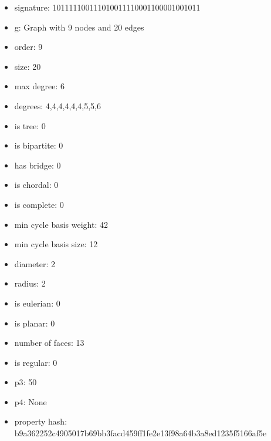 \newpage
\begin{figure}
\end{figure}
\begin{itemize}
\item signature: 101111100111010011110001100001001011
\item g: Graph with 9 nodes and 20 edges
\item order: 9
\item size: 20
\item max degree: 6
\item degrees: 4,4,4,4,4,4,5,5,6
\item is tree: 0
\item is bipartite: 0
\item has bridge: 0
\item is chordal: 0
\item is complete: 0
\item min cycle basis weight: 42
\item min cycle basis size: 12
\item diameter: 2
\item radius: 2
\item is eulerian: 0
\item is planar: 0
\item number of faces: 13
\item is regular: 0
\item p3: 50
\item p4: None
\item property hash: b9a362252c4905017b69bb3facd459ff1fe2e13f98a64b3a8ed1235f5166af5e
\end{itemize}
